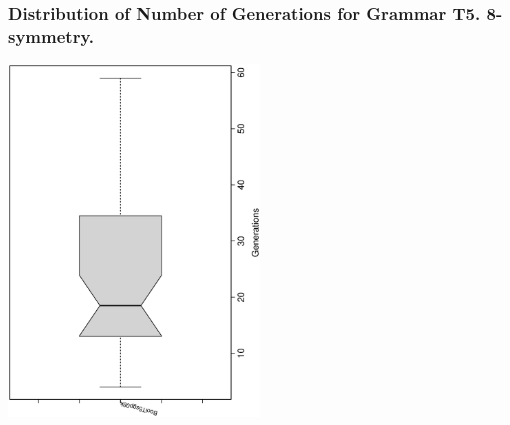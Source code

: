  \begin{frame}
 \frametitle{ Distribution of Number of Generations for Grammar T5. 8-symmetry. }
 \begin{center}
\includegraphics[width=0.5\textwidth, angle=-90]
{ExpFboxplottGenerations006.eps}
 \end{center}
 \label{ExpFboxplottGenerations006.eps}  
 \end{frame}

